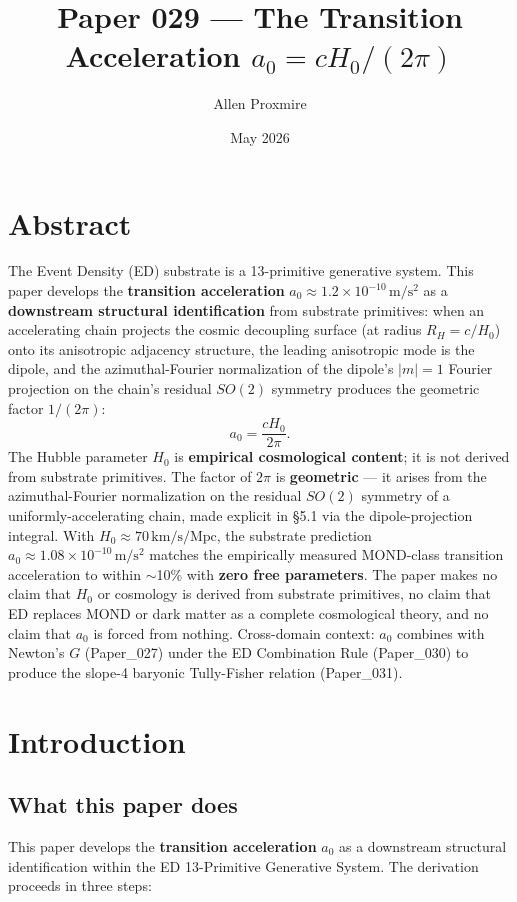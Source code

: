 \documentclass[11pt,a4paper]{article}
\title{\vspace{-1cm}\Large\bfseries Paper 029 --- The Transition Acceleration $a_0 = c H_0 / (2\pi)$}
\author{Allen Proxmire}
\date{May 2026}
\begin{document}
\maketitle

\section*{Abstract}

The Event Density (ED) substrate is a 13-primitive generative system. This paper develops the \textbf{transition acceleration} $a_0 \approx 1.2 \times 10^{-10}\,\mathrm{m/s^2}$ as a \textbf{downstream structural identification} from substrate primitives: when an accelerating chain projects the cosmic decoupling surface (at radius $R_H = c/H_0$) onto its anisotropic adjacency structure, the leading anisotropic mode is the dipole, and the azimuthal-Fourier normalization of the dipole's $|m|=1$ Fourier projection on the chain's residual $SO(2)$ symmetry produces the geometric factor $1/(2\pi)$:
\[
a_0 = \frac{c H_0}{2\pi}.
\]
The Hubble parameter $H_0$ is \textbf{empirical cosmological content}; it is not derived from substrate primitives. The factor of $2\pi$ is \textbf{geometric} --- it arises from the azimuthal-Fourier normalization on the residual $SO(2)$ symmetry of a uniformly-accelerating chain, made explicit in \S5.1 via the dipole-projection integral. With $H_0 \approx 70\,\mathrm{km/s/Mpc}$, the substrate prediction $a_0 \approx 1.08 \times 10^{-10}\,\mathrm{m/s^2}$ matches the empirically measured MOND-class transition acceleration to within $\sim$10\% with \textbf{zero free parameters}. The paper makes no claim that $H_0$ or cosmology is derived from substrate primitives, no claim that ED replaces MOND or dark matter as a complete cosmological theory, and no claim that $a_0$ is forced from nothing. Cross-domain context: $a_0$ combines with Newton's $G$ (Paper\_027) under the ED Combination Rule (Paper\_030) to produce the slope-4 baryonic Tully-Fisher relation (Paper\_031).

\section{Introduction}

\subsection{What this paper does}

This paper develops the \textbf{transition acceleration} $a_0$ as a downstream structural identification within the ED 13-Primitive Generative System. The derivation proceeds in three steps:
\end{document}
